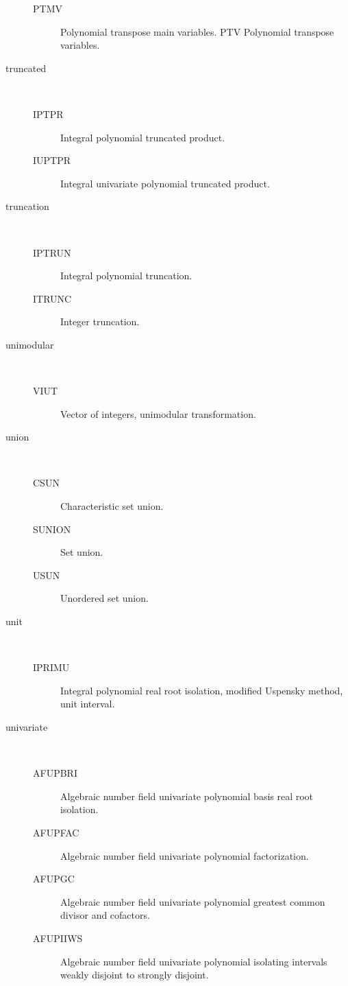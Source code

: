 \begin{description}
\begin{description}
  \item[PTMV]  Polynomial transpose main variables. PTV Polynomial transpose
    variables.
  \end{description}
\item[truncated] \ \ 
  \begin{description}
  \item[IPTPR]  Integral polynomial truncated product.
  \item[IUPTPR]  Integral univariate polynomial truncated product.
  \end{description}
\item[truncation] \ \ 
  \begin{description}
  \item[IPTRUN]  Integral polynomial truncation.
  \item[ITRUNC]  Integer truncation.
  \end{description}
\item[unimodular] \ \ 
  \begin{description}
  \item[VIUT]  Vector of integers, unimodular transformation.
  \end{description}
\item[union] \ \ 
  \begin{description}
  \item[CSUN]  Characteristic set union.
  \item[SUNION]  Set union.
  \item[USUN]  Unordered set union.
  \end{description}
\item[unit] \ \ 
  \begin{description}
  \item[IPRIMU]  Integral polynomial real root isolation, modified Uspensky
    method, unit interval.
  \end{description}
\item[univariate] \ \ 
  \begin{description}
  \item[AFUPBRI]  Algebraic number field univariate polynomial basis real root
    isolation.
  \item[AFUPFAC]  Algebraic number field univariate polynomial factorization.
  \item[AFUPGC]  Algebraic number field univariate polynomial greatest common
    divisor and cofactors.
  \item[AFUPIIWS]  Algebraic number field univariate polynomial isolating
    intervals weakly disjoint to strongly disjoint.

\end{description}
\end{description}
